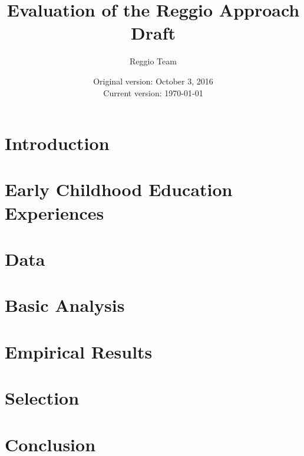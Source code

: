 




\title{Evaluation of the Reggio Approach \\ Draft}
\author{Reggio Team}
\date{Original version: October 3, 2016 \\ Current version: \today}
\maketitle

\doublespacing

\section{Introduction}
\label{sec:introduction}


\section{Early Childhood Education Experiences}
\label{sec:eceexperiences}


\section{Data}
\label{sec:data}


\section{Basic Analysis}
\label{sec:methodology}


\section{Empirical Results}
\label{sec:results}


\section{Selection}
\label{sec:selection}


\section{Conclusion}
\label{sec:conclusion}





